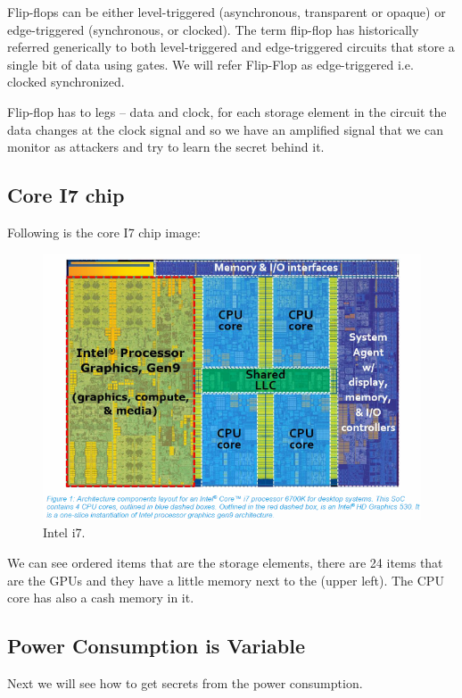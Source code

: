 Flip-flops can be either level-triggered (asynchronous, transparent or opaque)
or edge-triggered (synchronous, or clocked). The term flip-flop has historically
referred generically to both level-triggered and edge-triggered circuits that
store a single bit of data using gates. We will refer Flip-Flop as
edge-triggered i.e. clocked synchronized.

Flip-flop has to legs – data and clock, for each storage element in the circuit
the data changes at the clock signal and so we have an amplified signal that we
can monitor as attackers and try to learn the secret behind it.

 \subsection { Core I7 chip }
 
Following is the core I7 chip image:

\begin{figure}[!ht]
	\centering
	\includegraphics{images/i7.png}
	\caption{Intel i7.} \label{fig:i7}
\end{figure}

We can see ordered items that are the storage elements, there are 24 items that
are the GPUs and they have a little memory next to the (upper left). The CPU
core has also a cash memory in it.

\subsection { Power Consumption is Variable }

Next we will see how to get secrets from the power consumption.

